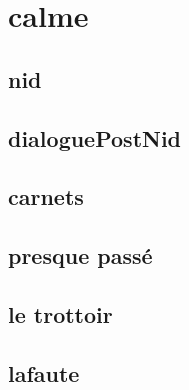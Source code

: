 \documentclass{article}
\begin{document}
\section{calme}
\subsection{nid}

\clearpage

\subsection{dialoguePostNid}

\clearpage

\subsection{carnets}

\clearpage

\subsection{presque passé}

\clearpage

\subsection{le trottoir}

\clearpage

\subsection{lafaute}

\end{document}
